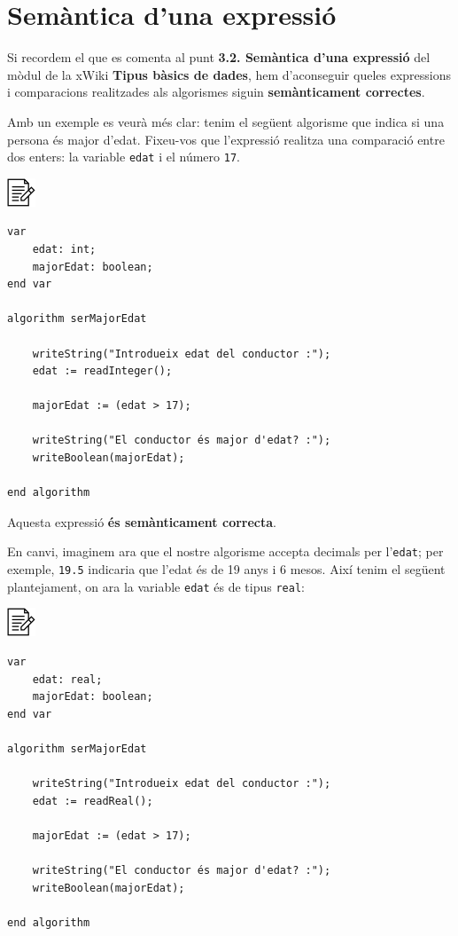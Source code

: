 \documentclass[]{book}
\begin{document}
\section{Semàntica d'una expressió}\label{semantica-duna-expressio}

Si recordem el que es comenta al punt \textbf{3.2. Semàntica d'una
expressió} del mòdul de la xWiki \textbf{Tipus bàsics de dades}, hem
d'aconseguir queles expressions i comparacions realitzades als
algorismes siguin \textbf{semànticament correctes}.

Amb un exemple es veurà més clar: tenim el següent algorisme que indica
si una persona és major d'edat. Fixeu-vos que l'expressió realitza una
comparació entre dos enters: la variable \texttt{edat} i el número
\texttt{17}.

\includegraphics{./img/alg.png}

\begin{verbatim}
var
    edat: int;
    majorEdat: boolean;
end var

algorithm serMajorEdat

    writeString("Introdueix edat del conductor :");
    edat := readInteger();

    majorEdat := (edat > 17);

    writeString("El conductor és major d'edat? :");
    writeBoolean(majorEdat);

end algorithm
\end{verbatim}

Aquesta expressió \textbf{és semànticament correcta}.

En canvi, imaginem ara que el nostre algorisme accepta decimals per
l'\texttt{edat}; per exemple, \texttt{19.5} indicaria que l'edat és de
19 anys i 6 mesos. Així tenim el següent plantejament, on ara la
variable \texttt{edat} és de tipus \texttt{real}:

\includegraphics{./img/alg.png}

\begin{verbatim}
var
    edat: real;
    majorEdat: boolean;
end var

algorithm serMajorEdat

    writeString("Introdueix edat del conductor :");
    edat := readReal();

    majorEdat := (edat > 17);

    writeString("El conductor és major d'edat? :");
    writeBoolean(majorEdat);

end algorithm
\end{verbatim}
\end{document}
